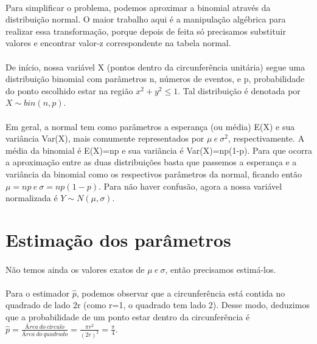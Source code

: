 \documentclass{article}
\begin{document}
    \paragraph{} Para simplificar o problema, podemos aproximar a binomial através da distribuição normal. O maior trabalho aqui é a manipulação algébrica para realizar essa transformação, porque depois de feita só precisamos substituir valores e encontrar valor-z correspondente na tabela normal.

    \paragraph{} De início, nossa variável X (pontos dentro da circunferência unitária) segue uma distribuição binomial com parâmetros n, números de eventos, e p, probabilidade do ponto escolhido estar na região \begin{math} x^2 + y^2 \le 1 \end{math}. Tal distribuição é denotada por $X \sim bin(n, p)$.

    \paragraph{}
    Em geral, a normal tem como parâmetros a esperança (ou média) E(X) e sua variância Var(X), mais comumente representados por \begin{math} \mu\ e\ \sigma^2 \end{math}, respectivamente. A média da binomial é E(X)=np e sua variância é Var(X)=np(1-p). Para que ocorra a aproximação entre as duas distribuições basta que passemos a esperança e a variância da binomial como os respectivos parâmetros da normal, ficando então \begin{math} \mu = np\ e\ \sigma = np(1-p) \end{math}. Para não haver confusão, agora a nossa variável normalizada é \begin{math} Y \sim N(\mu,\sigma) \end{math}.

    \section{Estimação dos parâmetros}
    \paragraph{} Não temos ainda os valores exatos de $\mu\ e\ \sigma$, então precisamos estimá-los.
    \paragraph{} Para o estimador $\widehat{p}$, podemos observar que a circunferência está contida no quadrado de lado 2r (como r=1, o quadrado tem lado 2). Desse modo, deduzimos que a probabilidade de um ponto estar dentro da circunferência é  $\widehat{p} = \frac{Área\ do\ círculo}{Área\ do\ quadrado} = \frac{\pi r^2}{(2r)^2} = \frac{\pi}{4}$.
\end{document}
